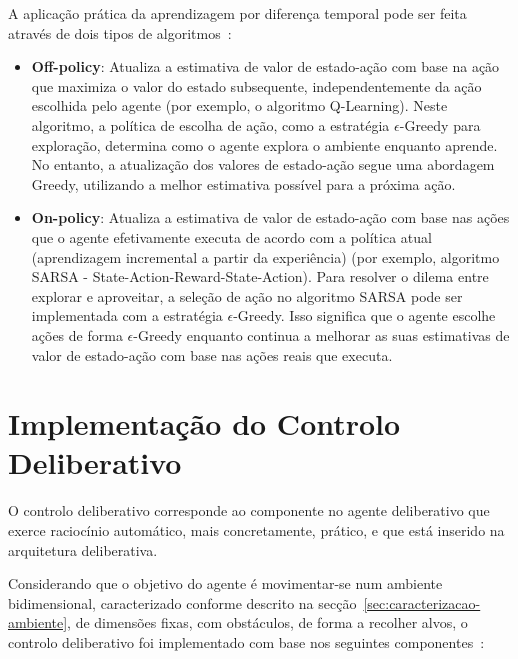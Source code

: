 A aplicação prática da aprendizagem por diferença temporal pode ser feita através de dois tipos de algoritmos~\cite{q-learning-algorithm}:

\begin{itemize}
    \item \textbf{Off-policy}:
    Atualiza a estimativa de valor de estado-ação com base na ação que maximiza o valor do estado subsequente, independentemente da ação escolhida pelo agente (por exemplo, o algoritmo Q-Learning).
    Neste algoritmo, a política de escolha de ação, como a estratégia $\epsilon$-Greedy para exploração, determina como o agente explora o ambiente enquanto aprende.
    No entanto, a atualização dos valores de estado-ação segue uma abordagem Greedy, utilizando a melhor estimativa possível para a próxima ação.
    \item \textbf{On-policy}: Atualiza a estimativa de valor de estado-ação com base nas ações que o agente efetivamente executa de acordo com a política atual (aprendizagem incremental a partir da experiência) (por exemplo, algoritmo SARSA - State-Action-Reward-State-Action).
    Para resolver o dilema entre explorar e aproveitar, a seleção de ação no algoritmo SARSA pode ser implementada com a estratégia $\epsilon$-Greedy.
    Isso significa que o agente escolhe ações de forma $\epsilon$-Greedy enquanto continua a melhorar as suas estimativas de valor de estado-ação com base nas ações reais que executa.
\end{itemize}


\section{Implementação do Controlo Deliberativo}\label{sec:implementacao-controlo-deliberativo}

O controlo deliberativo corresponde ao componente no agente deliberativo que exerce raciocínio automático, mais concretamente, prático, e que está inserido na arquitetura deliberativa.

Considerando que o objetivo do agente é movimentar-se num ambiente bidimensional, caracterizado conforme descrito na secção~\ref{sec:caracterizacao-ambiente}, de dimensões fixas, com obstáculos, de forma a recolher alvos, o controlo deliberativo foi implementado com base nos seguintes componentes~\cite{isel:iasa:slides:arq-agentes-deliberativos}:

